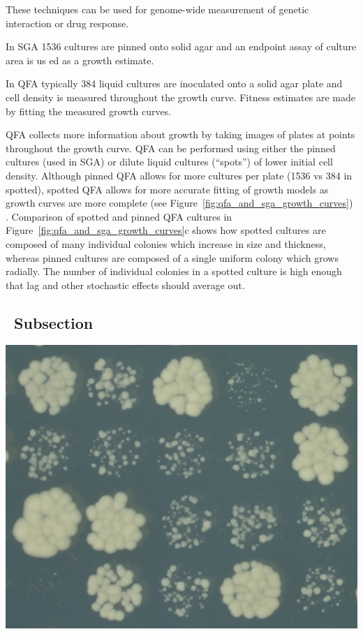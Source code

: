 These techniques can be used
for genome-wide measurement of genetic interaction or drug response.
\citep{Addinall2011}



In SGA 1536 cultures are pinned onto solid agar and an endpoint assay
of culture area is us ed as a growth estimate.

In QFA typically 384 liquid cultures are inoculated onto a solid agar
plate and cell density is measured throughout the growth
curve. Fitness estimates are made by fitting the measured growth
curves.


QFA
collects more information about growth by taking images of plates at
points throughout the growth curve. QFA can be performed using either
the pinned cultures (used in SGA) or dilute liquid cultures
(``spots'') of lower initial cell density. Although pinned QFA allows
for more cultures per plate (1536 vs 384 in spotted), spotted QFA
allows for more accurate fitting of growth models as growth curves are
more complete (see Figure~\ref{fig:qfa_and_sga_growth_curves})
\citep{Lawless2010}. Comparison of spotted and pinned QFA cultures in
Figure~\ref{fig:qfa_and_sga_growth_curves}c shows how spotted cultures
are composed of many individual colonies which increase in size and
thickness, whereas pinned cultures are composed of a single uniform
colony which grows radially. The number of individual colonies in a
spotted culture is high enough that lag and other stochastic effects
should average out.



\subsection{\thesubsection~Subsection}

\begin{Figure}
  \centering
  \includegraphics[width=\linewidth]{p15_section/p15_section}
  \label{fig:p15_section}
\end{Figure}


